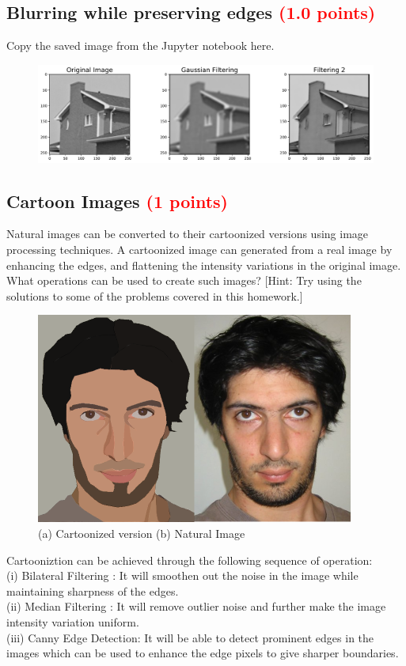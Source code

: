 \documentclass[answers]{exam}
\newcommand{\mypoints}[1]{\textcolor{red}{(#1 points)}}
\begin{document}
\subsection{Blurring while preserving edges \mypoints{1.0}}
Copy the saved image from the Jupyter notebook here.
\begin{solution}
\begin{figure}[H]
    \centering
    \includegraphics[width=1.0\linewidth]{Images/question_5_6.pdf}
\end{figure}
\end{solution}

\subsection{Cartoon Images \mypoints{1}} \label{sssec:focallength}
Natural images can be converted to their cartoonized versions using image processing techniques. A cartoonized image can generated from a real image by enhancing the edges, and flattening the intensity variations in the original image. What operations can be used to create such images?
[Hint: Try using the solutions to some of the problems covered in this homework.] 
\begin{figure}[H]
    \centering
    \includegraphics[width=0.5\linewidth]{Images/cartoon.png}
    \caption{(a) Cartoonized version (b) Natural Image}
\end{figure}
\begin{solution}
Cartooniztion can be achieved through the following sequence of operation:\\
(i) Bilateral Filtering : It will smoothen out the noise in the image while maintaining sharpness of the edges.\\
(ii) Median Filtering : It will remove outlier noise and further make the image intensity variation uniform.\\
(iii) Canny Edge Detection: It will be able to detect prominent edges in the images which can be used to enhance the edge pixels to give sharper boundaries. 
\end{solution}
\end{document}
